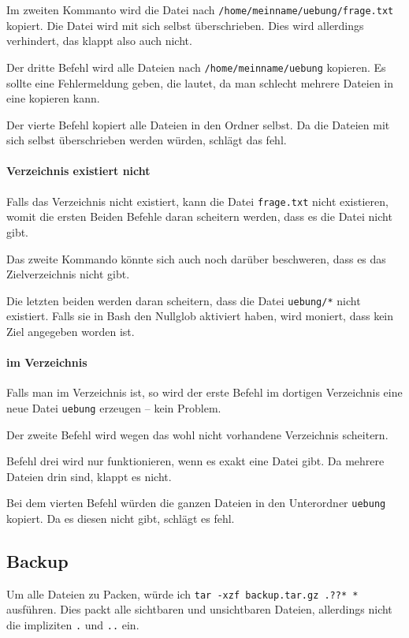 {Im zweiten Kommanto wird die Datei nach \texttt{/home/meinname/uebung/frage.txt} kopiert. Die Datei wird mit sich selbst überschrieben. Dies wird allerdings verhindert, das klappt also auch nicht.

Der dritte Befehl wird alle Dateien nach \texttt{/home/meinname/uebung} kopieren. Es sollte eine Fehlermeldung geben, die  lautet, da man schlecht mehrere Dateien in eine kopieren kann.

Der vierte Befehl kopiert alle Dateien in den Ordner selbst. Da die Dateien mit sich selbst überschrieben werden würden, schlägt das fehl.

\paragraph*{Verzeichnis existiert nicht} Falls das Verzeichnis nicht existiert, kann die Datei \texttt{frage.txt} nicht existieren, womit die ersten Beiden Befehle daran scheitern werden, dass es die Datei nicht gibt.

Das zweite Kommando könnte sich auch noch darüber beschweren, dass es das Zielverzeichnis nicht gibt.

Die letzten beiden werden daran scheitern, dass die Datei \texttt{uebung/*} nicht existiert. Falls sie in Bash den Nullglob aktiviert haben, wird moniert, dass kein Ziel angegeben worden ist.

\paragraph*{im Verzeichnis}

Falls man im Verzeichnis ist, so wird der erste Befehl im dortigen Verzeichnis eine neue Datei \texttt{uebung} erzeugen -- kein Problem.

Der zweite Befehl wird wegen das wohl nicht vorhandene Verzeichnis scheitern.

Befehl drei wird nur funktionieren, wenn es exakt eine Datei gibt. Da mehrere Dateien drin sind, klappt es nicht.

Bei dem vierten Befehl würden die ganzen Dateien in den Unterordner \texttt{uebung} kopiert. Da es diesen nicht gibt, schlägt es fehl.

\subsection{Backup}

Um alle Dateien zu Packen, würde ich \verb#tar -xzf backup.tar.gz .??* *# ausführen. Dies packt alle sichtbaren und unsichtbaren Dateien, allerdings nicht die impliziten \texttt{.} und \texttt{..} ein.

}

